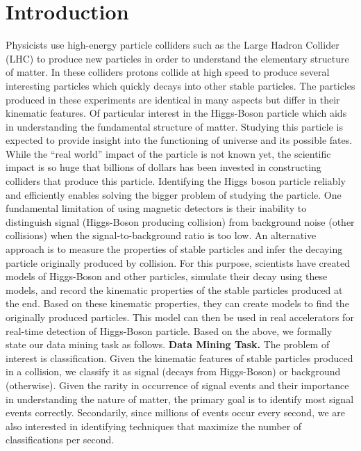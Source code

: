 \section{Introduction}
\label{sec:introduction}

Physicists use high-energy particle colliders such as the Large Hadron Collider (LHC) to produce new particles in order to understand the elementary structure of matter. In these colliders protons collide at high speed to produce several interesting particles which quickly decays into other stable particles. The particles produced in these experiments are identical in many aspects but differ in their kinematic features. Of particular interest in the Higgs-Boson particle which aids in understanding the fundamental structure of matter. Studying this particle is expected to provide insight into the functioning of universe and its possible fates. While the “real world” impact of the particle is not known yet, the scientific impact is so huge that billions of dollars has been invested in constructing colliders that produce this particle. Identifying the Higgs boson particle reliably and efficiently enables solving the bigger problem of studying the particle. 
One fundamental limitation of using magnetic detectors is their inability to distinguish signal (Higgs-Boson producing collision) from background noise (other collisions) when the signal-to-background ratio is too low. An alternative approach is to measure the properties of stable particles and infer the decaying particle originally produced by collision. For this purpose, scientists have created models of Higgs-Boson and other particles, simulate their decay using these models, and record the kinematic properties of the stable particles produced at the end. Based on these kinematic properties, they can create models to find the originally produced particles. This model can then be used in real accelerators for real-time detection of Higgs-Boson particle. Based on the above, we formally state our data mining task as follows.
\textbf{Data Mining Task.} The problem of interest is classification. Given the kinematic features of stable particles produced in a collision, we classify it as signal (decays from Higgs-Boson) or background (otherwise).
Given the rarity in occurrence of signal events and their importance in understanding the nature of matter, the primary goal is to identify most signal events correctly. Secondarily, since millions of events occur every second, we are also interested in identifying techniques that maximize the number of classifications per second. 

